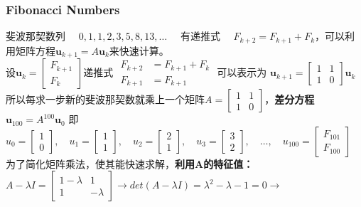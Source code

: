     \subsubsection{Fibonacci Numbers}
    斐波那契数列 $\quad 0,1,1,2,3,5,8,13, \ldots \quad$ 有递推式 $\quad F_{k+2}=F_{k+1}+F_{k}$，可以利用矩阵方程$\mathbf{u}_{k+1}=A \boldsymbol{u}_{k}$来快速计算。
    \\
    设$\bm{u}_{k}=\left[\begin{array}{c}{F_{k+1}} \\ {F_{k}}\end{array}\right] $\quad 递推式 $\begin{aligned} F_{k+2} &=F_{k+1}+F_{k} \\ F_{k+1} &=F_{k+1} \end{aligned}$ 可以表示为 $\bm{u}_{k+1}=\left[\begin{array}{cc}{1} & {1} \\ {1} & {0}\end{array}\right] \bm{u}_{k}$
    \\
    所以每求一步新的斐波那契数就乘上一个矩阵$A=\left[\begin{array}{ll}{1} & {1} \\ {1} & {0}\end{array}\right]$，\textbf{差分方程}$\bm{u}_{100} = A^{100} \bm{u}_0$ 即
    $u_{0}=\left[\begin{array}{l}{1} \\ {0}\end{array}\right], \quad u_{1}=\left[\begin{array}{l}{1} \\ {1}\end{array}\right], \quad u_{2}=\left[\begin{array}{l}{2} \\ {1}\end{array}\right], \quad u_{3}=\left[\begin{array}{l}{3} \\ {2}\end{array}\right], \quad \ldots, \quad u_{100}=\left[\begin{array}{l}{F_{101}} \\ {F_{100}}\end{array}\right]$
    \\
    为了简化矩阵乘法，使其能快速求解，\textbf{利用A的特征值：}\\
    $A-\lambda I=\left[\begin{array}{cc}{1-\lambda} & {1} \\ {1} & {-\lambda}\end{array}\right] \rightarrow det(A-\lambda I)=\lambda^{2}-\lambda-1=0 \rightarrow$\\
